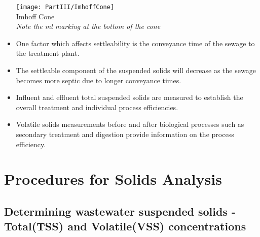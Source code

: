 \begin{itemize}
\begin{minipage}{0.65\textwidth}
			      \end{minipage}	
			      \begin{minipage}{0.25\textwidth}
			      	\begin{center}
			      		\texttt{[image: PartIII/ImhoffCone]}\\
			      		Imhoff Cone\\
			      		\emph{Note the ml marking at the bottom of the cone}
			      	\end{center}
			      \end{minipage}
			\item One factor which affects settleability is the conveyance time of the sewage to the treatment plant. 
			\item The settleable component of the suspended solids will decrease as the sewage becomes more septic due to longer conveyance times.
			\item Influent and effluent total suspended solids are measured to establish the overall treatment and individual process efficiencies.  
			\item Volatile solids measurements before and after biological processes such as secondary treatment and digestion provide information on the process efficiency.\\
		\end{itemize}

	\section{Procedures for Solids Analysis}
	\subsection{Determining wastewater suspended solids - Total(TSS) and Volatile(VSS) concentrations}			
				 
